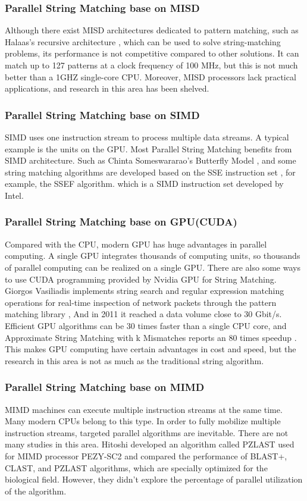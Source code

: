 \documentclass[11pt]{article}       %
\begin{document}
\subsubsection{Parallel String Matching base on MISD}
Although there exist MISD architectures dedicated to pattern matching, such as Halaas's recursive architecture \cite{MISD}, which can be used to solve string-matching problems, its performance is not competitive compared to other solutions. It can match up to 127 patterns at a clock frequency of 100 MHz, but this is not much better than a 1GHZ single-core CPU. Moreover, MISD processors lack practical applications, and research in this area has been shelved.


\subsubsection{Parallel String Matching base on SIMD}
SIMD uses one instruction stream to process multiple data streams. A typical example is the units on the GPU. Most Parallel String Matching benefits from SIMD architecture. Such as Chinta Someswararao's Butterfly Model \cite{Butterfly}, and some string matching algorithms are developed based on the SSE instruction set \cite{Matching}, for example, the SSEF algorithm. which is a SIMD instruction set developed by Intel. 

\subsubsection{Parallel String Matching base on GPU(CUDA)}
Compared with the CPU, modern GPU has huge advantages in parallel computing. A single GPU integrates thousands of computing units, so thousands of parallel computing can be realized on a single GPU. There are also some ways to use CUDA programming provided by Nvidia GPU for String Matching. Giorgos Vasiliadis implements string search and regular expression matching operations for real-time inspection of network packets through the pattern matching library \cite{Bit-Parallel}, And in 2011 it reached a data volume close to 30 Gbit/s. Efficient GPU algorithms can be 30 times faster than a single CPU core, and Approximate String Matching with k Mismatches reports an 80 times speedup \cite{pattern-matching}. This makes GPU computing have certain advantages in cost and speed, but the research in this area is not as much as the traditional string algorithm. 


\subsubsection{Parallel String Matching base on MIMD}
MIMD machines can execute multiple instruction streams at the same time. Many modern CPUs belong to this type. In order to fully mobilize multiple instruction streams, targeted parallel algorithms are inevitable. There are not many studies in this area. Hitoshi developed an algorithm called PZLAST used for MIMD processor PEZY-SC2 and compared the performance of BLAST+, CLAST, and PZLAST algorithms\cite{MIMD}, which are specially optimized for the biological field. However, they didn't explore the percentage of parallel utilization of the algorithm.
\end{document}
